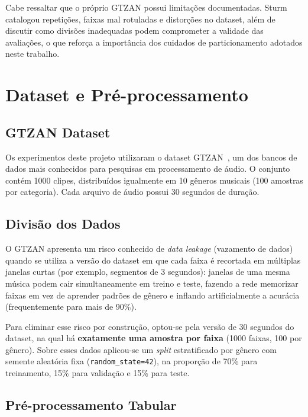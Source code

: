 \documentclass[conference]{IEEEtran}
\begin{document}
	Cabe ressaltar que o próprio GTZAN possui limitações documentadas. Sturm~\cite{sturm2013} catalogou repetições, faixas mal rotuladas e distorções no dataset, além de discutir como divisões inadequadas podem comprometer a validade das avaliações, o que reforça a importância dos cuidados de particionamento adotados neste trabalho.
	
	\section{Dataset e Pré-processamento}
	
	\subsection{GTZAN Dataset}
	
	Os experimentos deste projeto utilizaram o dataset GTZAN~\cite{tzanetakis2002}, um dos bancos de dados mais conhecidos para pesquisas em processamento de áudio. O conjunto contém 1000 clipes, distribuídos igualmente em 10 gêneros musicais (100 amostras por categoria). Cada arquivo de áudio possui 30 segundos de duração.
	
	\subsection{Divisão dos Dados}
	
	O GTZAN apresenta um risco conhecido de \textit{data leakage} (vazamento de dados) quando se utiliza a versão do dataset em que cada faixa é recortada em múltiplas janelas curtas (por exemplo, segmentos de 3 segundos): janelas de uma mesma música podem cair simultaneamente em treino e teste, fazendo a rede memorizar faixas em vez de aprender padrões de gênero e inflando artificialmente a acurácia (frequentemente para mais de 90\%).
	
	Para eliminar esse risco por construção, optou-se pela versão de 30 segundos do dataset, na qual há \textbf{exatamente uma amostra por faixa} (1000 faixas, 100 por gênero). Sobre esses dados aplicou-se um \textit{split} estratificado por gênero com semente aleatória fixa (\texttt{random\_state=42}), na proporção de 70\% para treinamento, 15\% para validação e 15\% para teste.
	
	\subsection{Pré-processamento Tabular}
	
\end{document}
